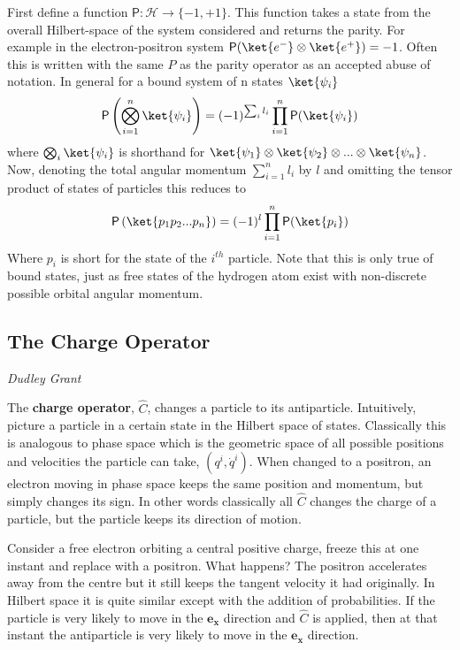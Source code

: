 First define a function $\mathsf{P}:\mathcal{H}\rightarrow \{-1,+1\}$. This function takes a state from the overall Hilbert-space of the system considered and returns the parity. For example in the electron-positron system $\mathsf{P}(\ket{e^-}\otimes\ket{e^+})=-1$. Often this is written with the same $P$ as the parity operator as an accepted abuse of notation. In general for a bound system of n states $\ket{\psi_i}$
\begin{align*}
\mathsf{P}\left(\bigotimes_{i=1}^n\ket{\psi_i}\right)=(-1)^{\sum_i l_i} \prod_{i=1}^n\mathsf{P}(\ket{\psi_i})
\end{align*}
where $\bigotimes_i\ket{\psi_i}$ is shorthand for $\ket{\psi_1}\otimes\ket{\psi_2}\otimes...\otimes\ket{\psi_n}$. Now, denoting the total angular momentum $\sum_{i=1}^n l_i$ by $l$ and omitting the tensor product of states of particles this reduces to
\begin{align*}
\mathsf{P}\left(\ket{p_1p_2...p_n}\right)=(-1)^{l} \prod_{i=1}^n\mathsf{P}(\ket{p_i})
\end{align*}
Where $p_i$ is short for the state of the $i^{th}$ particle. Note that this is only true of bound states, just as free states of the hydrogen atom exist with non-discrete possible orbital angular momentum.

\subsection{The Charge Operator}
\vspace{-1.0em}
\begin{center}
\tiny{\textit{Dudley Grant}}
\end{center}

The \textbf{charge operator}, $\hat{C}$, changes a particle to its antiparticle. Intuitively, picture a particle in a certain state in the Hilbert space of states. Classically this is analogous to phase space which is the geometric space of all possible positions and velocities the particle can take, $(q^i,\dot{q}^i)$. When changed to a positron, an electron moving in phase space keeps the same position and momentum, but simply changes its sign. In other words classically all $\hat{C}$ changes the charge of a particle, but the particle keeps its direction of motion.

Consider a free electron orbiting a central positive charge, freeze this at one instant and replace with a positron. What happens? The positron accelerates away from the centre but it still keeps the tangent velocity it had originally. In Hilbert space it is quite similar except with the addition of probabilities. If the particle is very likely to move in the $\mathbf{e_x}$ direction and $\hat{C}$ is applied, then at that instant the antiparticle is very likely to move in the $\mathbf{e_x}$ direction.

